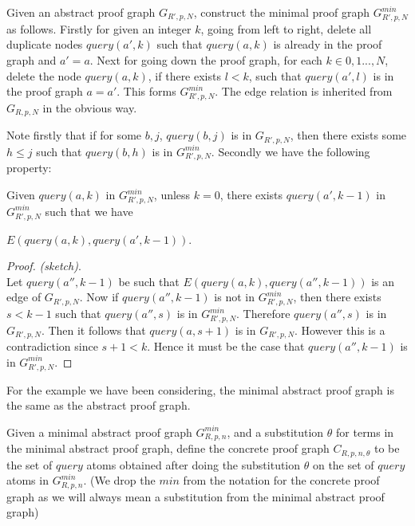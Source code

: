 \begin{definition}\label{minabsgraph}
Given an abstract proof graph $G_{R',p,N}$, construct the minimal proof graph $G_{R',p,N}^{min}$ as follows. Firstly for given an integer $k$, going from left to right, delete all duplicate nodes $query(a',k)$ such that $query(a,k)$ is already in the proof graph and $a'=a$. Next for going down the proof graph, for each $k\in {0,1...,N}$, delete the node $query(a,k)$, if there exists $l<k$, such that $query(a',l)$ is in the proof graph $a=a'$. This forms $G_{R',p,N}^{min}$. The edge relation is inherited from $G_{R,p,N}$ in the obvious way. 
\end{definition}
Note firstly that if for some $b,j$, $query(b,j)$ is in $G_{R',p,N}$, then there exists some $h\leq j$ such that $query(b,h)$ is in $G_{R',p,N}^{min}$. Secondly we have the following property:
\begin{lemma}
Given $query(a,k)$ in $G_{R',p,N}^{min}$, unless $k=0$, there exists $query(a',k-1)$ in $G_{R',p,N}^{min}$ such that we have 

$E(query(a,k),query(a',k-1))$.  
\end{lemma}


\begin{proof} \textit{(sketch)}. \\
Let $query(a'',k-1)$ be such that $E(query(a,k),query(a'',k-1))$ is an edge of $G_{R',p,N}$. Now if $query(a'',k-1)$ is not in $G_{R',p,N}^{min}$, then there exists $s<k-1$ such that $query(a'',s)$ is in $G_{R',p,N}^{min}$. Therefore $query(a'',s)$ is in $G_{R',p,N}$. Then it follows that $query(a,s+1)$ is in $G_{R',p,N}$. However this is a contradiction since $s+1<k$. Hence it must be the case that $query(a'',k-1)$ is in $G_{R',p,N}^{min}$. 
\end{proof}

For the example we have been considering, the minimal abstract proof graph is the same as the abstract proof graph.

\begin{definition}\label{def:concretegraph}
Given a minimal abstract proof graph $G_{R,p,n}^{min}$, and a substitution $\theta$ for
terms in the minimal abstract proof graph, define the concrete proof graph
$C_{R,p,n,\theta}$ to be the set of $query$ atoms obtained after doing the
substitution $\theta$ on the set of $query$ atoms in $G_{R,p,n}^{min}$. (We drop the $min$ from the notation for the concrete proof graph as we will always mean a substitution from the minimal abstract proof graph)
\end{definition}

